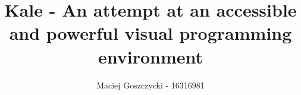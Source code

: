 \documentclass[11pt]{report}
\title{Kale - An attempt at an accessible and powerful visual programming
environment}
\author{Maciej Goszczycki - 16316981}
\date{}
\begin{document}
\maketitle
\tableofcontents
\clearpage
{}
\setcounter{page}{1}

\setlength\intextsep{0pt}

\DefineShortVerb{\|}



















\renewcommand*{\bibfont}{\raggedright}

\clearpage


\begin{appendices}
	
\end{appendices}
\end{document}
